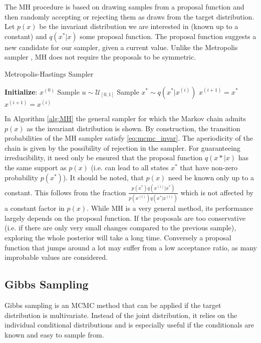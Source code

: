 The \gls{MH} procedure is based on drawing samples from a proposal function and then randomly accepting or rejecting them as draws from the target distribution.
Let $p(x)$ be the invariant distribution we are interested in (known up to a constant) and $q(x^*|x)$ some proposal function. The proposal function suggests a new candidate for our sampler, given a current value.
Unlike the Metropolis sampler \citep{metropolis1953equation}, \gls{MH} does not require the proposals to be symmetric.
\begin{algorithm}[H]
	\caption{Metropolis-Hastings Sampler}\label{alg:MH}
	\begin{algorithmic}
		\State \textbf{Initialize}: $x^{(0)}$
		\State Sample $u\sim \mathcal{U}_{[0,1]}$
		\State Sample $x^* \sim q(x^*|x^{(i)})$
		\State $x^{(i+1)} = x^*$
		\Else
		\State $x^{(i+1)} = x^{(i)}$
		\EndIf
		\EndFor
	\end{algorithmic}
\end{algorithm}

In Algorithm \autoref{alg:MH} the general sampler for which the Markov chain admits $p(x)$ as the invariant distribution is shown.
By construction, the transition probabilities of the \gls{MH} sampler satisfy \autoref{eq:mcmc_invar}. 
The aperiodicity of the chain is given by the possibility of rejection in the sampler.
For guaranteeing irreducibility, it need only be ensured that the proposal function $q(x*|x)$ has the same support as $p(x)$ (i.e. can lead to all states $x^*$ that have non-zero probability $p(x^*)$).
It should be noted, that $p(x)$ need be known only up to a constant. 
This follows from the fraction $\frac{p(x^*)q(x^{(i)} | x^*)}
{p(x^{(i)})q(x^*|x^{(i)})} $ which is not affected by a constant factor in $p(x)$.
While \gls{MH} is a very general method, its performance largely depends on the proposal function.
If the proposals are too conservative (i.e. if there are only very small changes compared to the previous sample), exploring the whole posterior will take a long time.
Conversely a proposal function that jumps around a lot may suffer from a low acceptance ratio, as many improbable values are considered.


\subsection{Gibbs Sampling}
\label{ss:Gibbs}
Gibbs sampling \citep{geman1984stochastic} is an MCMC method that can be applied if the target distribution is multivariate.
Instead of the joint distribution, it relies on the individual conditional distributions and is especially useful if the conditionals are known and easy to sample from.

